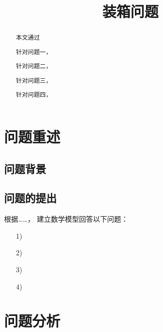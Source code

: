 \documentclass{cumcmthesis}
\title{装箱问题}
\begin{document}
\maketitle
\begin{abstract}
        本文通过

        针对问题一，
        
        针对问题二，
        
        针对问题三，
        
        针对问题四，
        
\end{abstract}

\tableofcontents

\newpage

\section{问题重述}

\subsection{问题背景}
              

\subsection{问题的提出}
    
        根据……，
    建立数学模型回答以下问题：
\begin{itemize}
    \item[1)]
    \item[2)]
    \item[3)]
    \item[4)]
\end{itemize}

\section{问题分析}
\end{document}
